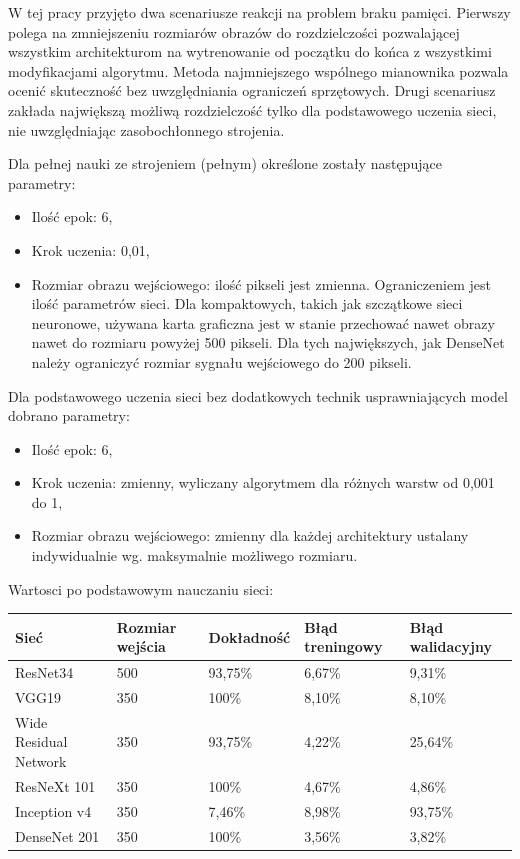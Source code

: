 \documentclass[12pt,a4paper,twoside,titlepage,openright]{book}
\begin{document}
\begin{itemize}
W tej pracy przyjęto dwa scenariusze reakcji na problem braku pamięci. Pierwszy polega na zmniejszeniu rozmiarów obrazów do rozdzielczości pozwalającej wszystkim architekturom na wytrenowanie od początku do końca z wszystkimi modyfikacjami algorytmu. Metoda najmniejszego wspólnego mianownika pozwala ocenić skuteczność bez uwzględniania ograniczeń sprzętowych. Drugi scenariusz zakłada największą możliwą rozdzielczość tylko dla podstawowego uczenia sieci, nie uwzględniając zasobochłonnego strojenia.

Dla pełnej nauki ze strojeniem (pełnym) określone zostały następujące parametry:
\begin{itemize}
\item Ilość epok: 6,
\item Krok uczenia: 0,01,
\item Rozmiar obrazu wejściowego: ilość pikseli jest zmienna. Ograniczeniem jest ilość parametrów sieci. Dla kompaktowych, takich jak szczątkowe sieci neuronowe, używana karta graficzna jest w stanie przechować nawet obrazy nawet do rozmiaru powyżej 500 pikseli. Dla tych największych, jak DenseNet należy ograniczyć rozmiar sygnału wejściowego do 200 pikseli.
\end{itemize}

Dla podstawowego uczenia sieci bez dodatkowych technik usprawniających model dobrano parametry:
\begin{itemize}
\item Ilość epok: 6,
\item Krok uczenia: zmienny, wyliczany algorytmem dla różnych warstw od 0,001 do 1,
\item Rozmiar obrazu wejściowego: zmienny dla każdej architektury ustalany indywidualnie wg. maksymalnie możliwego rozmiaru.
\end{itemize}

Wartosci po podstawowym nauczaniu sieci:
\begin{center}
    \begin{tabular}{ | l | l | l | l | l |}
    \hline
    Sieć & Rozmiar wejścia & Dokładność & Błąd treningowy & Błąd walidacyjny \\ \hline
    ResNet34 & 500 & 93,75\% & 6,67\% & 9,31\% \\ \hline
    VGG19 & 350 & 100\%& 8,10\% & 8,10\%\\ \hline
    Wide Residual Network & 350 & 93,75\% & 4,22\% & 25,64\% \\ \hline
    ResNeXt 101 & 350 & 100\%& 4,67\% & 4,86\%\\\hline
    Inception v4 & 350 & 7,46\% & 8,98\% & 93,75\% \\ \hline
    DenseNet 201 & 350 & 100\% & 3,56\% & 3,82\% \\ \hline
    \end{tabular}
\end{center}


\end{itemize}
\end{document}
